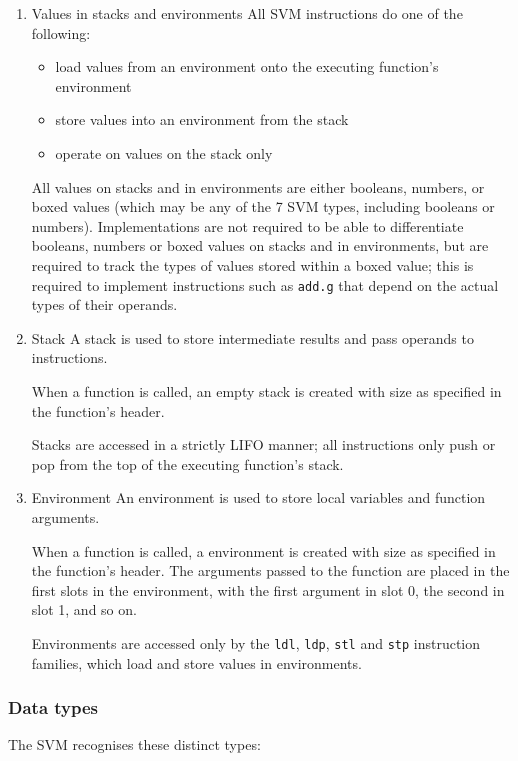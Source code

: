 \documentclass[11pt]{article}
\begin{document}
\begin{enumerate}
\item Values in stacks and environments
\label{sec:org806609b}
All SVM instructions do one of the following:

\begin{itemize}
\item load values from an environment onto the executing function's
environment
\item store values into an environment from the stack
\item operate on values on the stack only
\end{itemize}

All values on stacks and in environments are either booleans, numbers,
or boxed values (which may be any of the 7 SVM types, including booleans
or numbers). Implementations are not required to be able to
differentiate booleans, numbers or boxed values on stacks and in
environments, but are required to track the types of values stored
within a boxed value; this is required to implement instructions such as
\texttt{add.g} that depend on the actual types of their operands.

\item Stack
\label{sec:org1887c3f}
A stack is used to store intermediate results and pass operands to
instructions.

When a function is called, an empty stack is created with size as
specified in the function's header.

Stacks are accessed in a strictly LIFO manner; all instructions only
push or pop from the top of the executing function's stack.

\item Environment
\label{sec:org3d9330d}
An environment is used to store local variables and function arguments.

When a function is called, a environment is created with size as
specified in the function's header. The arguments passed to the function
are placed in the first slots in the environment, with the first
argument in slot 0, the second in slot 1, and so on.

Environments are accessed only by the \texttt{ldl}, \texttt{ldp}, \texttt{stl} and \texttt{stp}
instruction families, which load and store values in environments.
\end{enumerate}

\subsubsection{Data types}
\label{sec:org7f680a2}
The SVM recognises these distinct types:
\end{document}
